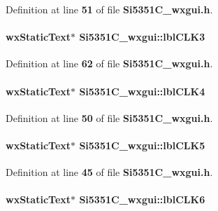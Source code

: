 Definition at line {\bf 51} of file {\bf Si5351\+C\+\_\+wxgui.\+h}.

\paragraph[{lbl\+C\+L\+K3}]{\setlength{\rightskip}{0pt plus 5cm}wx\+Static\+Text$\ast$ Si5351\+C\+\_\+wxgui\+::lbl\+C\+L\+K3}\label{classSi5351C__wxgui_adeb66387fe6ee7b609632c843b7717f9}


Definition at line {\bf 62} of file {\bf Si5351\+C\+\_\+wxgui.\+h}.

\paragraph[{lbl\+C\+L\+K4}]{\setlength{\rightskip}{0pt plus 5cm}wx\+Static\+Text$\ast$ Si5351\+C\+\_\+wxgui\+::lbl\+C\+L\+K4}\label{classSi5351C__wxgui_aa57067bb2b6e2b330da240c3cca59391}


Definition at line {\bf 50} of file {\bf Si5351\+C\+\_\+wxgui.\+h}.

\paragraph[{lbl\+C\+L\+K5}]{\setlength{\rightskip}{0pt plus 5cm}wx\+Static\+Text$\ast$ Si5351\+C\+\_\+wxgui\+::lbl\+C\+L\+K5}\label{classSi5351C__wxgui_a94cf0181df37c7d7f0192bd0a3176c6b}


Definition at line {\bf 45} of file {\bf Si5351\+C\+\_\+wxgui.\+h}.

\paragraph[{lbl\+C\+L\+K6}]{\setlength{\rightskip}{0pt plus 5cm}wx\+Static\+Text$\ast$ Si5351\+C\+\_\+wxgui\+::lbl\+C\+L\+K6}\label{classSi5351C__wxgui_aef14010947b31d6bcde0f946abe36e98}


